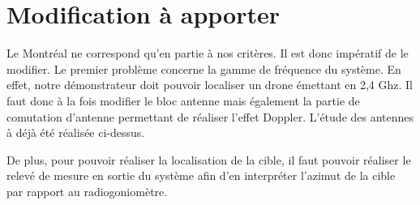 \section{Modification à apporter}

	Le Montréal ne correspond qu'en partie à nos critères. Il est donc impératif de le modifier.
	Le premier problème concerne la gamme de fréquence du système. En effet, notre démonstrateur doit pouvoir localiser un drone émettant en 2,4 Ghz. Il faut donc à la fois modifier le bloc antenne mais également la partie de comutation d'antenne permettant de réaliser l'effet Doppler. L'étude des antennes à déjà été réalisée ci-dessus.

	De plus, pour pouvoir réaliser la localisation de la cible, il faut pouvoir réaliser le relevé de mesure en sortie du système afin d'en interpréter l'azimut de la cible par rapport au radiogoniomètre.

